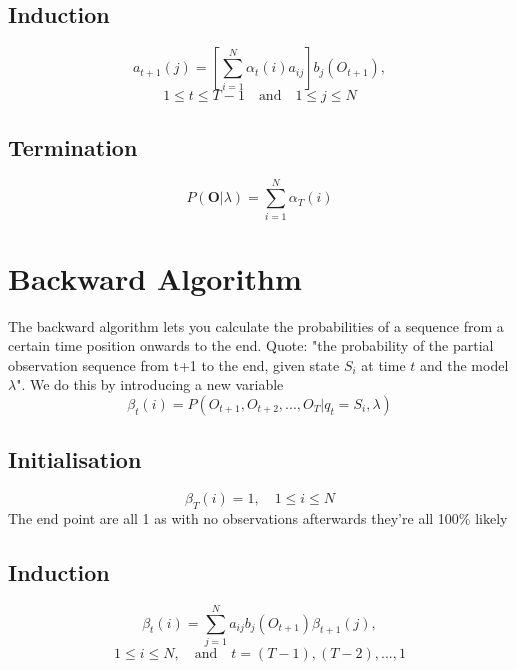 \documentclass[]{article}
\begin{document}
		\subsection{Induction}
			\begin{equation}
				a_{t+1}(j)=\left[ \sum_{i=1}^{N} \alpha_t(i)a_{ij} \right] b_j(O_{t+1}),
			\end{equation}
			\begin{equation}
				1 \le t \le T-1 \quad \text{and} \quad	1 \le j \le N
			\end{equation}
			
		\subsection{Termination}
			\begin{equation}
				P(\mathbf{O} | \lambda) = \sum_{i=1}^{N} \alpha_T(i)
			\end{equation}
	\section{Backward Algorithm}
		The backward algorithm lets you calculate the probabilities of a sequence from a certain time position onwards to the end. Quote: "the probability of the partial observation sequence from t+1 to the end, given state $S_i$ at time $t$ and the model $\lambda$". We do this by introducing a new variable 
		\begin{equation}
			\beta_t(i) = P(O_{t+1},O_{t+2},...,O_T|q_t=S_i,\lambda)
		\end{equation}
		\subsection{Initialisation}
			\begin{equation}
				\beta_T(i)=1, \quad 1 \le i \le N
			\end{equation}
			The end point are all 1 as with no observations afterwards they're all 100\% likely
		\subsection{Induction}
			\begin{equation}
				\beta_t(i)=\sum_{j=1}^{N}a_{ij}b_j(O_{t+1})\beta_{t+1}(j),
			\end{equation}
			\begin{equation}
				1 \le i \le N, \quad \text{and} \quad t= (T-1), (T-2),...,1
			\end{equation}
\end{document}
